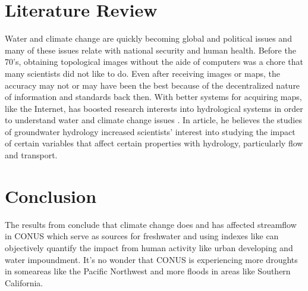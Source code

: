 \documentclass[a4paper,man,biblatex]{apa7}
\begin{document}
\section{Literature Review} Water and climate change are quickly becoming global and political issues and many of these issues relate with national security and human health. Before the 70's, obtaining topological images without the aide of computers was a chore that many scientists did not like to do. Even after receiving images or maps, the accuracy may not or may have been the best because of the decentralized nature of information and standards back then. With better systems for acquiring maps, like the Internet, has boosted research interests into hydrological systems in order to understand water and climate change issues \autocite{bras_1999}. In \textcite{bras_1999} article, he believes the studies of groundwater hydrology increased scientists' interest into studying the impact of certain variables that affect certain properties with hydrology, particularly flow and transport.

\section{Conclusion} The results from \textcite{rice_2016} conclude that climate change does and has affected streamflow in CONUS which serve as sources for freshwater and using indexes like \textcite{falcone_2016} can objectively quantify the impact from human activity like urban developing and water impoundment. It's no wonder that CONUS is experiencing more droughts in someareas like the Pacific Northwest and more floods in areas like Southern California. 


\printbibliography
\end{document}

